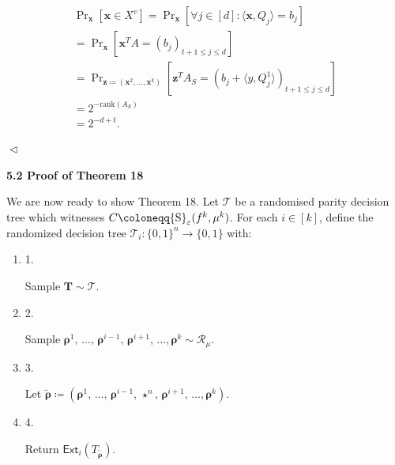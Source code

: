 \[\begin{gathered}
\displaystyle\Pr\nolimits_{\bm{x}}[\bm{x}\in X^{v}] \displaystyle=\Pr\nolimits_{\bm{x}}[\forall j\in[d]:\langle\bm{x},Q_{j}\rangle=b_{j}] \\
\displaystyle=\Pr\nolimits_{\bm{x}}[\bm{x}^{T}A=(b_{j})_{t+1\leq j\leq d}] \\
\displaystyle=\Pr\nolimits_{\bm{z}\coloneqq(\bm{x}^{2},\dots,\bm{x}^{k})}\left[\bm{z}^{T}A_{S}=(b_{j}+\langle y,Q_{j}^{1}\rangle)_{t+1\leq j\leq d}\right] \\
\displaystyle=2^{-\mathrm{rank}(A_{S})} \\
\displaystyle=2^{-d+t}.\
\end{gathered}\]


$\vartriangleleft$\par






\par\medskip\noindent\textbf{
5.2 Proof of Theorem 18
}\par




We are now ready to show Theorem 18. Let $\mathcal{T}$ be a randomised parity decision tree which witnesses $C\coloneqq{\textup{S}}_{\varepsilon}(f^{k},\mu^{k})$. For each $i\in[k]$, define the randomized decision tree $\mathcal{T}_{i}\colon\{0,1\}^{n}\to\{0,1\}$ with:\par


\begin{enumerate}


\item[] 
1. 


Sample $\bm{T}\sim\mathcal{T}$.\par





\item[] 
2. 


Sample $\bm{\rho}^{1},\,\ldots,\,\bm{\rho}^{i-1},\,\bm{\rho}^{i+1},\,\ldots,\bm{\rho}^{k}\sim\mathcal{R}_{\mu}$.\par





\item[] 
3. 


Let $\widetilde{\bm{\rho}}\coloneqq(\bm{\rho}^{1},\,\ldots,\,\bm{\rho}^{i-1},\,\star^{n},\,\bm{\rho}^{i+1},\,\ldots,\bm{\rho}^{k})$.\par





\item[] 
4. 


Return $\mathsf{Ext}_{i}\mathopen{}\left(T_{\widetilde{\bm{\rho}}}\mathclose{}\right)$.\par





\end{enumerate}


